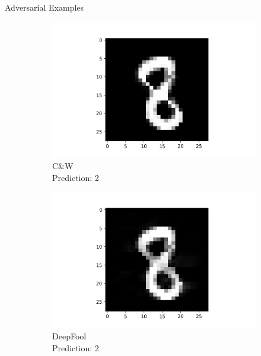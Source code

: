 \documentclass[9pt]{beamer}
\begin{document}
\begin{frame}{Adversarial Examples}
\begin{figure}
    \begin{subfigure}[t]{0.23\linewidth}
        \centering
        \captionsetup{justification=centering}
        \includegraphics[width=\linewidth]{images/CW_2.png}
        \caption{C\&W\\Prediction: 2}
    \end{subfigure}
    \begin{subfigure}[t]{0.23\linewidth}
        \centering
        \captionsetup{justification=centering}
        \captionsetup{justification=centering}
        \includegraphics[width=\linewidth]{images/DeepFool_2.png}
        \caption{DeepFool\\Prediction: 2}
    \end{subfigure}
    \begin{subfigure}[t]{0.23\linewidth}
        \centering
        \captionsetup{justification=centering}

\end{subfigure}
\end{figure}
\end{frame}
\end{document}
